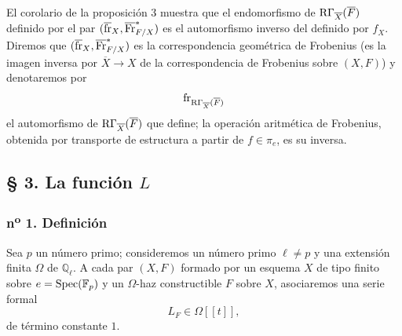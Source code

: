 El corolario de la proposición 3 muestra que el endomorfismo de $\mathrm{R}\Gamma_{\overline X}(\overline F)$ definido por el par $(\overline{\operatorname{fr}}_X,\overline{\operatorname{Fr}}^*_{F/X})$ es el automorfismo inverso del definido por $f_X$. Diremos que $(\overline{\operatorname{fr}}_X,\overline{\operatorname{Fr}}^*_{F/X})$ es la correspondencia geométrica de Frobenius (es la imagen inversa por $\overline X\to X$ de la correspondencia de Frobenius sobre $(X,F)$) y denotaremos por
\[
\operatorname{fr}_{\mathrm{R}\Gamma_{\overline X}(\overline F)}
\]
el automorfismo de $\mathrm{R}\Gamma_{\overline X}(\overline F)$ que define; la operación aritmética de Frobenius, obtenida por transporte de estructura a partir de $f\in\pi_e$, es su inversa.

\subsection*{§ 3. La función $L$}

\subsubsection*{n\textsuperscript{o} 1. Definición}

Sea $p$ un número primo; consideremos un número primo $\ell\ne p$ y una extensión finita $\Omega$ de $\mathbb Q_\ell$. A cada par $(X,F)$ formado por un esquema $X$ de tipo finito sobre $e=\operatorname{Spec}(\mathbb F_p)$ y un $\Omega$-haz constructible $F$ sobre $X$, asociaremos una serie formal
\[
L_F\in\Omega[[t]],
\]
de término constante $1$.



